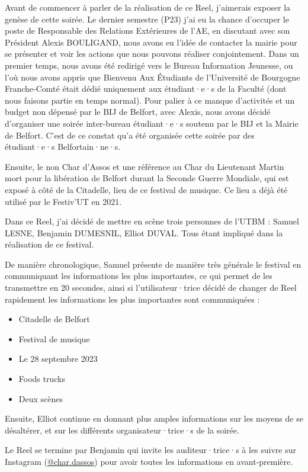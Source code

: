 Avant de commencer à parler de la réalisation de ce Reel, j'aimerais exposer la genèse de cette soirée.
Le dernier semestre (P23) j'ai eu la chance d'occuper le poste de Responsable des Relations Extérieures de l'\gls{AE}, en discutant avec son Président Alexis BOULIGAND, nous avons eu l'idée de contacter la mairie pour se présenter et voir les actions que nous pouvons réaliser conjointement.
Dans un premier temps, nous avons été redirigé vers le Bureau Information Jeunesse, ou l'où nous avons appris que Bienvenu Aux Étudiants de l'Université de Bourgogne Franche-Comté était dédié uniquement aux étudiant·e·s de la Faculté (dont nous faisons partie en temps normal).
Pour palier à ce manque d'activités et un budget non dépensé par le BIJ de Belfort, avec Alexis, nous avons décidé d'organiser une soirée inter-bureau étudiant·e·s soutenu par le BIJ et la Mairie de Belfort.
C'est de ce constat qu'a été organisée cette soirée par des étudiant·e·s Belfortain·ne·s.

Ensuite, le non Char d'Assos et une référence au Char du Lieutenant Martin mort pour la libération de Belfort durant la Seconde Guerre Mondiale, qui est exposé à côté de la Citadelle, lieu de ce festival de musique.
Ce lieu a déjà été utilisé par le Festiv'UT en 2021.

Dans ce Reel, j'ai décidé de mettre en scène trois personnes de l'\gls{UTBM} : Samuel LESNE, Benjamin DUMESNIL, Elliot DUVAL.
Tous étant impliqué dans la réalisation de ce festival.

De manière chronologique, Samuel présente de manière très générale le festival en communiquant les informations les plus importantes, ce qui permet de les transmettre en 20 secondes, ainsi si l'utilisateur·trice décidé de changer de Reel rapidement les informations les plus importantes sont communiquées :
\begin{itemize}
    \item Citadelle de Belfort
    \item Festival de musique
    \item Le 28 septembre 2023
    \item Foods trucks
    \item Deux scènes
\end{itemize}

Ensuite, Elliot continue en donnant plus amples informations sur les moyens de se désaltérer, et sur les différents organisateur·trice·s de la soirée.

Le Reel se termine par Benjamin qui invite les auditeur·trice·s à les suivre sur Instagram (\href{https://www.instagram.com/char.dassos/}{@char.dassos}) pour avoir toutes les informations en avant-première.

